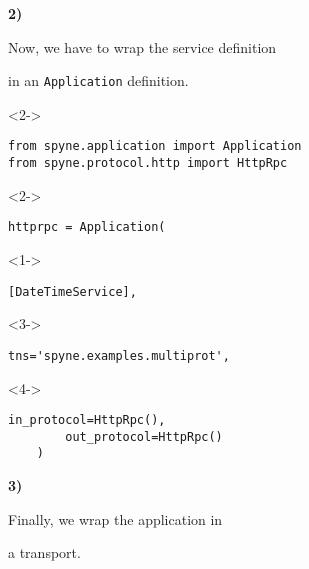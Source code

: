 \documentclass{beamer}
\begin{document}
\begin{frame}
  \LARGE

  \color{red} \textbf{2)} \color{black}

  \begin{center}
    Now, we have to wrap the service definition

    \bigskip

    in an \texttt{Application} definition.

  \end{center}

\end{frame}

\begin{frame}[fragile]
\begin{uncoverenv}<2->
  \vspace{-13pt}
  \begin{lstlisting}[frame=none]
from spyne.application import Application
from spyne.protocol.http import HttpRpc
  \end{lstlisting}
\end{uncoverenv}
\begin{uncoverenv}<2->
  \begin{lstlisting}[frame=none]
httprpc = Application(
  \end{lstlisting}
\end{uncoverenv}
\begin{uncoverenv}<1->
  \vspace{-13pt}
  \begin{lstlisting}[frame=none]
        [DateTimeService],
  \end{lstlisting}
\end{uncoverenv}
\begin{uncoverenv}<3->
  \vspace{-13pt}
  \begin{lstlisting}[frame=none]
        tns='spyne.examples.multiprot',
  \end{lstlisting}
\end{uncoverenv}
\begin{uncoverenv}<4->
  \vspace{-13pt}
  \begin{lstlisting}[frame=none]
        in_protocol=HttpRpc(),
        out_protocol=HttpRpc()
    )
  \end{lstlisting}
\end{uncoverenv}
\end{frame}

\begin{frame}
  \LARGE
  \color{red} \textbf{3)} \color{black}

  \begin{center}
    Finally, we wrap the application in

    \bigskip

    a transport.

  \end{center}

\end{frame}
\end{document}
